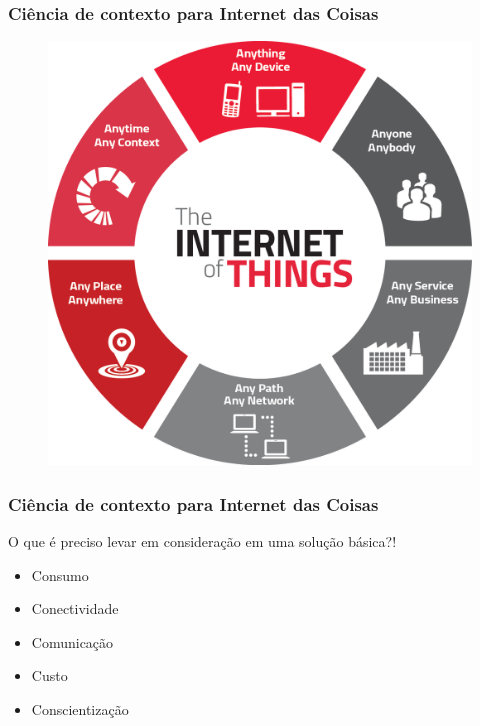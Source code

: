 \documentclass{beamer}
\begin{document}
\begin{frame}
	\frametitle{Ciência de contexto para Internet das Coisas}
	\begin{figure}
		\centering
		\includegraphics[width=0.7\linewidth]{contextosdeiot}
	\end{figure}	
\end{frame}

\begin{frame}
	\frametitle{Ciência de contexto para Internet das Coisas}
	O que é preciso levar em consideração em uma solução básica?!
	\begin{itemize}
		\item Consumo
		\item Conectividade
		\item Comunicação
		\item Custo
		\item Conscientização
	\end{itemize}
\end{frame}

\frame{\titlepage}
\end{document}
